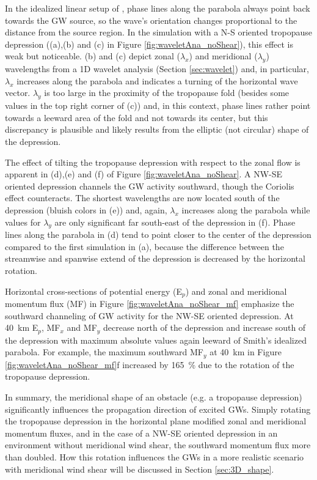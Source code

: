 In the idealized linear setup of \textcite[]{smith_linear_1980}, phase lines along the parabola always point back towards the GW source, so the wave's orientation changes proportional to the distance from the source region. In the simulation with a N-S oriented tropopause depression ((a),(b) and (c) in Figure \ref{fig:waveletAna_noShear}), this effect is weak but noticeable. (b) and (c) depict zonal ($\lambda_x$) and meridional ($\lambda_y$) wavelengths from a 1D wavelet analysis (Section \ref{sec:wavelet}) and, in particular, $\lambda_x$ increases along the parabola and indicates a turning of the horizontal wave vector. $\lambda_y$ is too large in the proximity of the tropopause fold (besides some values in the top right corner of (c)) and, in this context, phase lines rather point towards a leeward area of the fold and not towards its center, but this discrepancy is plausible and likely results from the elliptic (not circular) shape of the depression.

The effect of tilting the tropopause depression with respect to the zonal flow is apparent in (d),(e) and (f) of Figure \ref{fig:waveletAna_noShear}. A NW-SE oriented depression channels the GW activity southward, though the Coriolis effect counteracts. The shortest wavelengths are now located south of the depression (bluish colors in (e)) and, again, $\lambda_x$ increases along the parabola while values for $\lambda_y$ are only significant far south-east of the depression in (f). Phase lines along the parabola in (d) tend to point closer to the center of the depression compared to the first simulation in (a), because the difference between the streamwise and spanwise extend of the depression is decreased by the horizontal rotation.

Horizontal cross-sections of potential energy (E$_p$) and zonal and meridional momentum flux (MF) in Figure \ref{fig:waveletAna_noShear_mf} emphasize the southward channeling of GW activity for the NW-SE oriented depression. At \SI{40}{\kilo\meter} E$_p$, MF$_x$ and MF$_y$ decrease north of the depression and increase south of the depression with maximum absolute values again leeward of Smith's idealized parabola. For example, the maximum southward MF$_y$ at \SI{40}{\kilo\meter} in Figure \ref{fig:waveletAna_noShear_mf}f increased by \SI{165}{\percent} due to the rotation of the tropopause depression.

In summary, the meridional shape of an obstacle (e.g. a tropopause depression) significantly influences the propagation direction of excited GWs. Simply rotating the tropopause depression in the horizontal plane modified zonal and meridional momentum fluxes, and in the case of a NW-SE oriented depression in an environment without meridional wind shear, the southward momentum flux more than doubled. How this rotation influences the GWs in a more realistic scenario with meridional wind shear will be discussed in Section \ref{sec:3D_shape}.

